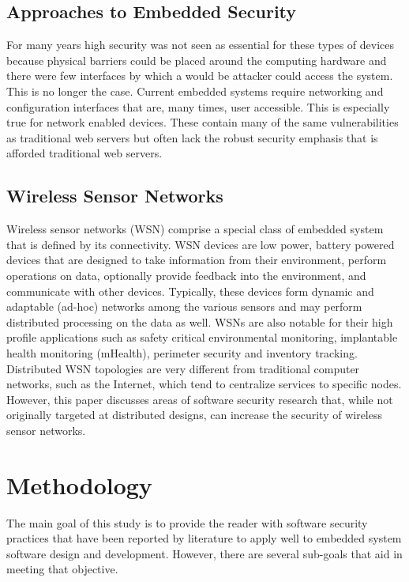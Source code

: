 \documentclass[draftcls,onecolumn,conference,12pt]{IEEEtran}
\begin{document}
\subsection{Approaches to Embedded Security}

For many years high security was not seen as essential for these types of devices because physical barriers could be placed around the computing hardware and there were few interfaces by which a would be attacker could access the system.  This is no longer the case.  Current embedded systems require networking and configuration interfaces that are, many times, user accessible.  This is especially true for network enabled devices.  These contain many of the same vulnerabilities as traditional web servers but often lack the robust security emphasis that is afforded traditional web servers. \cite{Kumar2012}

\subsection{Wireless Sensor Networks}

Wireless sensor networks (WSN) comprise a special class of embedded system that is defined by its connectivity.  WSN devices are low power, battery powered devices that are designed to take information from their environment, perform operations on data, optionally provide feedback into the environment, and communicate with other devices.  Typically, these devices form dynamic and adaptable (ad-hoc) networks among the various sensors and may perform distributed processing on the data as well.  WSNs are also notable for their high profile applications such as safety critical environmental monitoring, implantable health monitoring (mHealth), perimeter security and inventory tracking.\cite{Bojinov2010,Mahdavi-Hezavehi2013}  Distributed WSN topologies are very different from traditional computer networks, such as the Internet, which tend to centralize services to specific nodes. However, this paper discusses areas of software security research that, while not originally targeted at distributed designs, can increase the security of wireless sensor networks.

\section{Methodology}
The main goal of this study is to provide the reader with software security practices that have been reported by literature to apply well to embedded system software design and development.  However, there are several sub-goals that aid in meeting that objective.  
\end{document}
